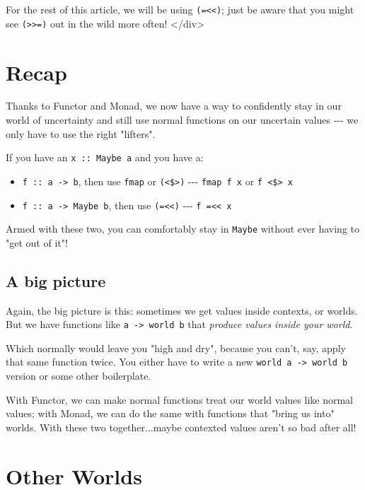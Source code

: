 \documentclass[]{article}
\begin{document}
For the rest of this article, we will be using
\texttt{(=\textless{}\textless{})}; just be aware that you might see
\texttt{(\textgreater{}\textgreater{}=)} out in the wild more often!
\textless{}/div\textgreater{}

\section{Recap}

Thanks to Functor and Monad, we now have a way to confidently stay in our world
of uncertainty and still use normal functions on our uncertain values -\/-\/- we
only have to use the right "lifters".

If you have an \texttt{x\ ::\ Maybe\ a} and you have a:

\begin{itemize}
\item
  \texttt{f\ ::\ a\ -\textgreater{}\ b}, then use \texttt{fmap} or
  \texttt{(\textless{}\$\textgreater{})} -\/-\/- \texttt{fmap\ f\ x} or
  \texttt{f\ \textless{}\$\textgreater{}\ x}
\item
  \texttt{f\ ::\ a\ -\textgreater{}\ Maybe\ b}, then use
  \texttt{(=\textless{}\textless{})} -\/-\/-
  \texttt{f\ =\textless{}\textless{}\ x}
\end{itemize}

Armed with these two, you can comfortably stay in \texttt{Maybe} without ever
having to "get out of it"!

\subsection{A big picture}

Again, the big picture is this: sometimes we get values inside contexts, or
worlds. But we have functions like \texttt{a\ -\textgreater{}\ world\ b} that
\emph{produce values inside your world}.

Which normally would leave you "high and dry", because you can't, say, apply
that same function twice. You either have to write a new
\texttt{world\ a\ -\textgreater{}\ world\ b} version or some other boilerplate.

With Functor, we can make normal functions treat our world values like normal
values; with Monad, we can do the same with functions that "bring us into"
worlds. With these two together...maybe contexted values aren't so bad after
all!

\section{Other Worlds}
\end{document}
